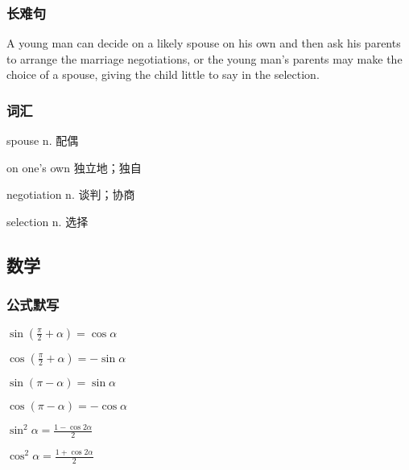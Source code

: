 \documentclass[UTF8]{ctexart}
\begin{document}
\subsubsection{长难句}
A young man can decide on a likely spouse on his own and then ask his parents to arrange the marriage negotiations, or the young man's parents may make the choice of a spouse, giving the child little to say in the selection.
\subsubsection{词汇}
spouse n. 配偶

on one's own 独立地；独自

negotiation n. 谈判；协商

selection n. 选择
\subsection{数学}
\subsubsection{公式默写}
\begin{multicols}{3}
    $\sin\left ( \frac{\pi}{2} + \alpha  \right ) =\cos \alpha$

    $\cos\left ( \frac{\pi}{2}+\alpha\right )=-\sin \alpha$

    $\sin \left ( \pi - \alpha\right )=\sin \alpha$

    $\cos \left ( \pi - \alpha\right )=-\cos \alpha$

    $\sin^2\alpha=\frac{1-\cos 2\alpha}{2}$

    $\cos^2\alpha=\frac{1+\cos 2\alpha}{2}$
\end{multicols}
\end{document}
